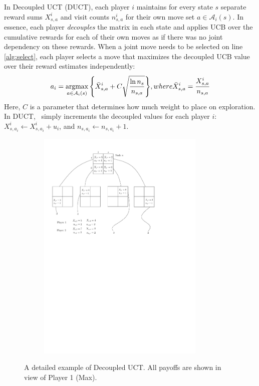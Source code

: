 \documentclass[conference]{IEEEtran}
\newcommand{\argmax}{\operatornamewithlimits{argmax}}
\newcommand{\cA}{\mathcal{A}}
\begin{document}
In Decoupled UCT (DUCT), each player $i$ maintains for every state $s$ separate reward sums $X^i_{s,a}$ and 
visit counts $n^i_{s,a}$ for their own move set $a \in \cA_i(s)$. 
In essence, each player {\it decouples} the matrix in each state and applies UCB over the cumulative rewards for 
each of their own moves as if there was no joint dependency on these rewards.
When a joint move needs to be selected on line 
\ref{alg:select}, each player selects a move that maximizes the decoupled UCB value over their reward estimates 
independently:
\begin{equation}
\label{eq:duct}
a_i = \argmax_{a \in \cA_i(s)}{ \left\{ \bar{X}^i_{s,a} + C \sqrt{\frac{\ln n_s}{n_{s,a}}} \right\} }, 
  \mbox{ where } \bar{X}^i_{s,a} = \frac{X^i_{s,a}}{n_{s,a}}
\end{equation}
\noindent Here, $C$ is a parameter that determines how much weight to place on exploration. 
In DUCT, \Update~simply increments the decoupled values for each player $i$: $X^i_{s,a_i} \leftarrow X^i_{s,a_i} + u_i$,
and $n_{s,a_i} \leftarrow n_{s,a_i} + 1$. 

\begin{figure}[t!]
\centering
\begin{subfigure}{8cm}
\centering
\includegraphics[width=8.0cm]{figures/tree3}\\
\end{subfigure}
\caption{A detailed example of Decoupled UCT. All payoffs are shown in view of Player 1 (Max).\label{fig:example2}}
\end{figure}
\end{document}
